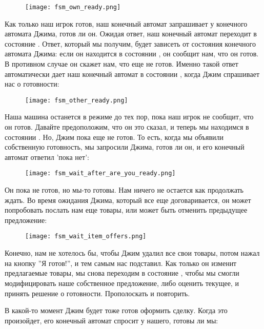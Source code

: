 \begin{figure}[H]
    \centering
    \texttt{[image: fsm\_own\_ready.png]}
\end{figure}

Как только наш игрок готов, наш конечный автомат запрашивает у конечного автомата Джима, готов ли он.
Ожидая ответ, наш конечный автомат переходит в состояние .
Ответ, который мы получим, будет зависеть от состояния конечного автомата Джима: если он находится в состоянии , он сообщит нам, что он готов.
В противном случае он скажет нам, что еще не готов.
Именно такой ответ автоматически дает наш конечный автомат в состоянии , когда Джим спрашивает нас о готовности:

\begin{figure}[H]
    \centering
    \texttt{[image: fsm\_other\_ready.png]}
\end{figure}

Наша машина останется в режиме  до тех пор, пока наш игрок не сообщит, что он готов.
Давайте предоположим, что он это сказал, и теперь мы находимся в состоянии .
Но, Джим пока еще не готов.
То есть, когда мы объявили собственную готовность, мы запросили Джима, готов ли он, и его конечный автомат ответил 'пока нет':

\begin{figure}[H]
    \centering
    \texttt{[image: fsm\_wait\_after\_are\_you\_ready.png]}
\end{figure}

Он пока не готов, но мы\--то готовы.
Нам ничего не остается как продолжать ждать.
Во время ожидания Джима, который все еще договаривается, он может попробовать послать нам еще товары, или может быть отменить предыдущее предложение:

\begin{figure}[H]
    \centering
    \texttt{[image: fsm\_wait\_item\_offers.png]}
\end{figure}

Конечно, нам не хотелось бы, чтобы Джим удалил все свои товары, потом нажал на кнопку ''Я готов!'', и тем самым нас подставил.
Как только он изменит предлагаемые товары, мы снова переходим в состояние , чтобы мы смогли модифицировать наше собственное предложение, либо оценить текущее, и принять решение о готовности.
Прополоскать и повторить.

В какой\--то момент Джим будет тоже готов оформить сделку.
Когда это произойдет, его конечный автомат спросит у нашего, готовы ли мы:

